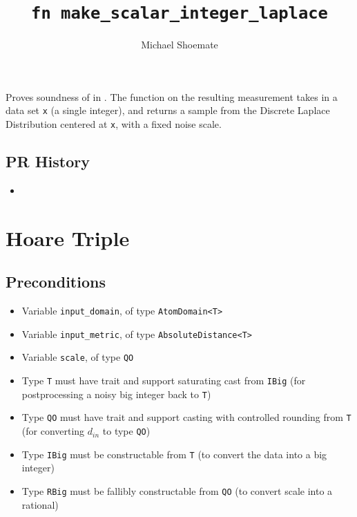 \documentclass{article}
\title{\texttt{fn make\_scalar\_integer\_laplace}}
\author{Michael Shoemate}
\begin{document}
\maketitle

\contrib

Proves soundness of  in .
The function on the resulting measurement takes in a data set \texttt{x} (a single integer), 
and returns a sample from the Discrete Laplace Distribution centered at \texttt{x}, with a fixed noise scale.

\subsection*{PR History}
\begin{itemize}
    \item {}
\end{itemize}

\section{Hoare Triple}

\subsection*{Preconditions}
\begin{itemize}
    \item Variable \texttt{input\_domain}, of type \texttt{AtomDomain<T>}
    \item Variable \texttt{input\_metric}, of type \texttt{AbsoluteDistance<T>}
    \item Variable \texttt{scale}, of type \texttt{QO}
    \item Type \texttt{T} must have trait  and support saturating cast from \texttt{IBig} (for postprocessing a noisy big integer back to \texttt{T})
    \item Type \texttt{QO} must have trait  and support casting with controlled rounding from \texttt{T} (for converting $d_{in}$ to type \texttt{QO})
    \item Type \texttt{IBig} must be constructable from \texttt{T} (to convert the data into a big integer)
    \item Type \texttt{RBig} must be fallibly constructable from \texttt{QO} (to convert scale into a rational)
\end{itemize}
\end{document}
